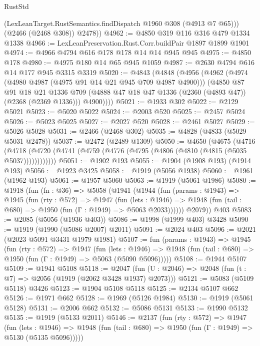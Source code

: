 \begin{lexlean}{RustStd}
\begin{coremodule}
          (LexLeanTarget.RustSemantics.findDispatch @1960 @308 (@4913 @7 @65)))
        (@2466 (@2468 @308))
        @2478))
@4962 := @4850 @319 @116 @316 @479 @1334 @1338
@4966 := LexLeanPreservation.Rust.Corr.buildPair @1897 @1899 @1901
@4974 := @4966 @4794 @616 @178 @178 @14 @14 @945 @945
@4975 := @4850 @178
@4980 := @4975 @180 @14 @65 @945 @1059
@4987 := @2630 @4794 @616 @14 @177 @945 @3315 @3319
@5020 := @4843
    (@4848
      (@4956
        (@4962
          (@4974 (@4980 @4987 (@4975 @91 @14 @21 @945 @709 @4987 @4900)))
          (@4850
            @87
            @91
            @18
            @21
            @1336
            @709
            (@4888 @47 @18 @47 @1336 (@2360 (@4893 @47)) (@2368 (@2369 @1336)))
            @4900))))
@5021 := @1933 @302
@5022 := @2129 @5021
@5023 := @5020 @5022
@5024 := @2003 @520
@5025 := @2457 @5024
@5026 := @5023 @5025
@5027 := @2027 @520
@5028 := @2461 @5027
@5029 := @5026 @5028
@5031 := @2466 (@2468 @302)
@5035 := @4828 (@4833 (@5029 @5031 @2478))
@5037 := @2472 (@2489 @1309)
@5050 := @4650
    (@4675
      (@4716 (@4718 (@4720 (@4741 (@4759 (@4776 (@4795 (@4806 (@4810 (@4815 (@5035 @5037))))))))))))
@5051 := @1902 @193
@5055 := @1904 (@1908 @193) (@1914 @193)
@5056 := @1923 @3425
@5058 := @1919 (@5056 @1938)
@5060 := @1961 (@1962 @193)
@5061 := @1957 @5060
@5063 := @1919 (@5061 @1986)
@5080 := @1918
    (fun (fn : @36) =>
    @5058
      (@1941
        (@1944
          (fun (params : @1943) =>
          @1945
            (fun (rty : @572) =>
            @1947
              (fun (lets : @1946) =>
              @1948 (fun (tail : @680) => @1950 (fun (Γ : @1949) => @5063 @2033))))))
        @2079))
    @403
@5083 := @2085 (@5056 (@1936 @403))
@5086 := @1998 (@1999 @403) @3428
@5090 := @1919 (@1990 (@5086 @2007) @2011)
@5091 := @2024 @403
@5096 := @2021 (@2023 @5091 @3431 @1979 @1981)
@5107 := fun (params : @1943) =>
  @1945
    (fun (rty : @572) =>
    @1947
      (fun (lets : @1946) =>
      @1948 (fun (tail : @680) => @1950 (fun (Γ : @1949) => @5063 (@5090 @5096)))))
@5108 := @1944 @5107
@5109 := @1941 @5108
@5118 := @2047 (fun (U : @2046) => @2048 (fun (t : @7) => @2056 (@1919 (@2062 @3428 @1937) @2073)))
@5121 := @5083 (@5109 @5118) @3426
@5123 := @1904 @5108 @5118
@5125 := @2134 @5107 @662
@5126 := @1971 @662
@5128 := @1969 (@5126 @1984)
@5130 := @1919 (@5061 @5128)
@5131 := @2006 @662
@5132 := @5086 @5131
@5133 := @1990 @5132
@5135 := @1919 (@5133 @2011)
@5146 := @2137
    (fun (rty : @572) =>
    @1947
      (fun (lets : @1946) =>
      @1948 (fun (tail : @680) => @1950 (fun (Γ : @1949) => @5130 (@5135 @5096)))))

\end{coremodule}
\end{lexlean}
